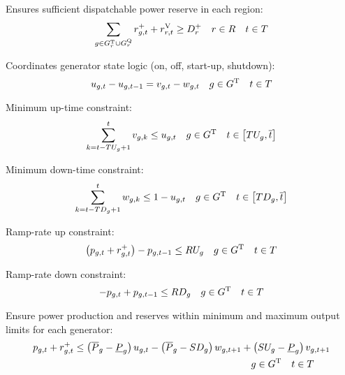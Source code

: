 \documentclass{article}
\begin{document}
Ensures sufficient dispatchable power reserve in each region:
\begin{equation}
\sum\limits_{\iGenerator \in \sGeneratorsThermal_{\iRegion} \cup \sStorage_{\iRegion}} \vReserveUp + \vReserveUpViolation \geq \cReserveUpRequirement \quad  \iRegion \in \sRegions \quad  \iInterval \in \sIntervals
\label{eqn: reserve constraints}
\end{equation}

Coordinates generator state logic (on, off, start-up, shutdown):
\begin{equation}
\vOnIndicator - \vOnIndicator[\iGenerator,\iInterval-1] = \vStartupIndicator - \vShutdownIndicator \quad  \iGenerator \in \sGeneratorsThermal \quad  \iInterval \in \sIntervals
\end{equation}

Minimum up-time constraint:
\begin{equation}
\sum\limits_{\iIntervalAlias=\iInterval-\cUpTimeMin + 1}^{\iInterval} \vStartupIndicator[\iGenerator,\iIntervalAlias] \leq \vOnIndicator \quad  \iGenerator \in \sGeneratorsThermal  \quad  \iInterval \in \left[\cUpTimeMin, \iIntervalTerminal \right]
\end{equation}

Minimum down-time constraint:
\begin{equation}
\sum\limits_{\iIntervalAlias=\iInterval-\cDownTimeMin[\iGenerator]+1}^{\iInterval}\vShutdownIndicator[\iGenerator,\iIntervalAlias] \leq 1 - \vOnIndicator \quad  \iGenerator \in \sGeneratorsThermal  \quad  \iInterval \in \left[\cDownTimeMin, \iIntervalTerminal \right]
\end{equation}

Ramp-rate up constraint:
\begin{equation}
\left(\vPower + \vReserveUp\right) - \vPower[\iGenerator,\iInterval-1] \leq \cRampRateUp \quad  \iGenerator \in \sGeneratorsThermal  \quad  \iInterval \in \sIntervals
\end{equation}

Ramp-rate down constraint:
\begin{equation}
- \vPower + \vPower[\iGenerator,\iInterval-1] \leq \cRampRateDown \quad  \iGenerator \in \sGeneratorsThermal  \quad  \iInterval \in \sIntervals
\end{equation}

Ensure power production and reserves within minimum and maximum output limits for each generator:
\begin{align}
	\begin{split}
	\vPower + \vReserveUp \leq \left(\cPowerOutputMax[\iGenerator] - \cPowerOutputMin\right) \vOnIndicator - \left(\cPowerOutputMax[\iGenerator] -\cRampRateShutdown \right) \vShutdownIndicator[\iGenerator,\iInterval+1] & + \left(\cRampRateStartup - \cPowerOutputMin\right)\vStartupIndicator[\iGenerator,\iInterval+1]\\
	& \quad  \iGenerator \in \sGeneratorsThermal  \quad  \iInterval \in \sIntervals\\
	\end{split}
\end{align}
\end{document}
